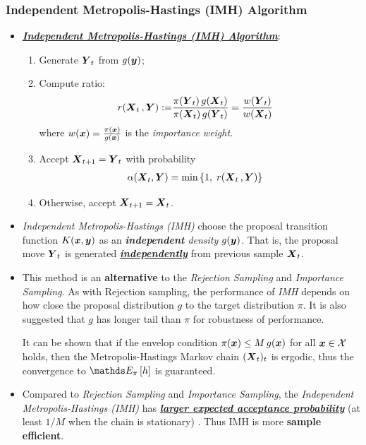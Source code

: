 \documentclass[11pt]{article}
\begin{document}
\subsubsection{Independent Metropolis-Hastings (IMH) Algorithm}
\begin{itemize}
\item \underline{\emph{\textbf{Independent Metropolis-Hastings (IMH) Algorithm}}}:
\begin{enumerate}
\item Generate $\boldsymbol{Y}_t$ from $g(\boldsymbol{y})$;
\item Compute ratio:
\begin{align}
r(\boldsymbol{X}_{t}\,, \boldsymbol{Y}):= &\frac{\pi(\boldsymbol{Y}_t)\,g(\boldsymbol{X}_{t})}{\pi(\boldsymbol{X}_{t})\,g(\boldsymbol{Y}_t)} = \frac{w(\boldsymbol{Y}_t)}{w(\boldsymbol{X}_t)} \label{eqn: imh_hastings_ratio}
\end{align} where $w(\boldsymbol{x}) = \frac{\pi(\boldsymbol{x})}{g(\boldsymbol{x})}$ is the \emph{importance weight}.
\item Accept $\boldsymbol{X}_{t+1} = \boldsymbol{Y}_t$ with probability 
\begin{align*}
\alpha(\boldsymbol{X}_{t}, \boldsymbol{Y}) &= \min\left\{1,\;r(\boldsymbol{X}_{t}\,, \boldsymbol{Y})\right\}
\end{align*}
\item Otherwise, accept $\boldsymbol{X}_{t+1} = \boldsymbol{X}_{t}$.
\end{enumerate}

\item \emph{Independent Metropolis-Hastings (IMH)} choose the proposal transition function  $K(\boldsymbol{x}, \boldsymbol{y})$ as an \emph{\textbf{independent} density} $g(\boldsymbol{y})$. That is, the proposal move $\boldsymbol{Y}_t$ is generated \underline{\emph{\textbf{independently}}} from previous sample $\boldsymbol{X}_t$. 

\item This method is an \textbf{alternative} to the \emph{Rejection Sampling} and \emph{Importance Sampling}. As with Rejection sampling, the performance of \emph{IMH} depends on how close the proposal distribution $g$ to the target distribution $\pi$. It is also suggested that 
$g$ has longer tail than $\pi$ for robustness of performance. 

It can be shown that if the envelop condition $\pi(\boldsymbol{x}) \le M\,g(\boldsymbol{x})$ for all $\boldsymbol{x}\in {\mathcal X}$ holds, then the Metropolis-Hastings Markov chain $(\boldsymbol{X}_t)_t$ is ergodic, thus the convergence to $\E{\pi}{h}$ is guaranteed.

\item Compared to \emph{Rejection Sampling} and \emph{Importance Sampling}, the \emph{Independent Metropolis-Hastings (IMH)} has   \underline{\emph{\textbf{larger expected acceptance probability}}} (at least $1/M$ when the chain is stationary) \citep{robert1999monte}. Thus IMH is more \textbf{sample efficient}.
\end{itemize}
\end{document}
